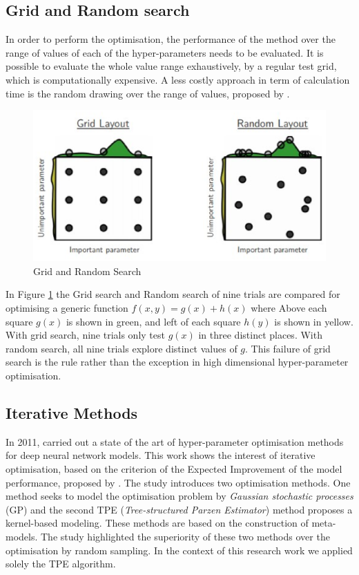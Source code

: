 \subsection{Grid and Random search} \label{Grid and Random search}

In order to perform the optimisation, the performance of the method over the range of values of each of the hyper-parameters needs to be evaluated. It is possible to evaluate the whole value range exhaustively, by a regular test grid, which is computationally expensive. A less costly approach in term of calculation time is the random drawing over the range of values, proposed by \citep{bergstra2012random}. 
\begin{figure}
\centerline{\includegraphics[scale=0.7]{images/chapter_2/random_search.eps}}
\caption{Grid and Random Search \citep{bergstra2012random}}
\label{fig:Grid and Random Search}
\end{figure}
In Figure \ref{fig:Grid and Random Search} the Grid search and Random search of nine trials are compared for optimising a generic function $f(x, y) = g(x) + h(x)$ where Above each square $g(x)$ is shown in green, and left of each square $h(y)$ is shown in yellow. With grid search, nine trials only test $g(x)$ in three distinct places. With random search, all nine trials explore distinct values of $g$. This failure of grid search is the rule rather than the exception in high dimensional hyper-parameter optimisation.

\subsection{Iterative Methods}

In 2011, \citep{bergstra2011algorithms} carried out a state of the art of hyper-parameter optimisation methods for deep neural network models. This work shows the interest of iterative optimisation, based on the criterion of the Expected Improvement of the model performance, proposed by \citep{jones2001taxonomy}. The study introduces two optimisation methods. One method seeks to model the optimisation problem by \textit{Gaussian stochastic processes} (GP) and the second TPE (\textit{Tree-structured Parzen Estimator}) method proposes a kernel-based modeling. These methods are based on the construction of meta-models. The study highlighted the superiority of these two methods over the optimisation by random sampling. In the context of this research work we applied solely the TPE algorithm.

